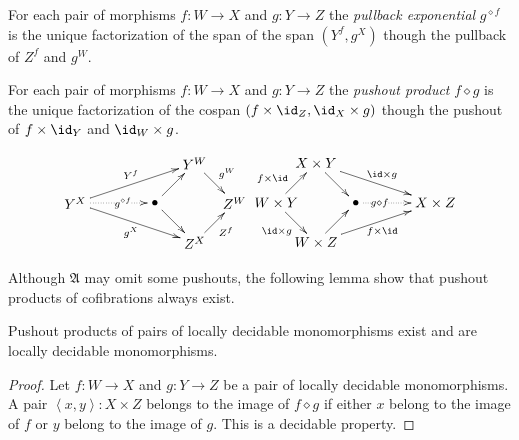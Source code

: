 \documentclass{tac}
\newcommand\hide[1]{}
\newcommand\of{:}
\newcommand\tuplet[1]{\left\langle #1 \right\rangle}
\newcommand\pe[1]{^{\diamond #1}}
\newcommand\pp{\mathbin\diamond}
\newcommand\ambient{\mathfrak A}
\begin{document}
\begin{definition} For each pair of morphisms $f\of W\to X$ and $g\of Y\to Z$ the \emph{pullback exponential} $g\pe f$ is the unique factorization of the span of the span $(Y^f, g^X)$ though the pullback of $Z^f$ and $g^W$. 
\hide{\[\xymatrix{
Y^X \ar@/^2ex/[rr]^{Y^f} \ar[dr]_{g^X} \ar@{.>}[r]_(.6){g\pe f}
& \bullet \ar[r]\ar[d] & Y^W \ar[d]^{g^W} \\
& Z^X \ar[r]_{Z^f} & Z^W
}\]}

For each pair of morphisms $f\of W\to X$ and $g\of Y\to Z$ the \emph{pushout product} $f\pp g$ is the unique factorization of the cospan $(f\times \id_Z , \id_X\times g)$ though the pushout of $f\times \id_Y$ and $\id_W\times g$. 
\hide{\[\xymatrix{
W\times Y \ar[r]^{f\times \id} \ar[d]_{\id\times g} \po & X\times Y \ar[d] \ar[dr]^{\id\times g} \\
W\times Z \ar[r] \ar@/_2ex/[rr]_{f\times\id} & \bullet \ar[r]^(.4){f\pp g} & X\times Z
}\]}
\[\xy
(0,10)*+{Y^X}="left",(20,10)*+{\bullet}="middle",(30,20)*+{Y^W}="top",(30,0)*+{Z^X}="bottom",(40,10)*+{Z^W}="right"
\ar^{Y^f} "left";"top" \ar_{g^X} "left";"bottom" \ar@{.>}|(.6){g\pe f} "left";"middle" 
\ar "middle";"top" \ar "middle";"bottom" \ar^{g^W} "top";"right" \ar_{Z^f} "bottom";"right"
\endxy\xy
(0,10)*+{W\times Y}="left",(20,10)*+{\bullet}="middle",(10,20)*+{X\times Y}="top",(10,0)*+{W\times Z}="bottom",(40,10)*+{X\times Z}="right"
\ar^(.4){f\times \id} "left";"top" \ar_{\id\times g} "left";"bottom" \ar "top";"middle" \ar "bottom";"middle"
\ar@{.>}|(.3){g\pp f} "middle";"right" \ar^{\id\times g} "top";"right" \ar_{f\times\id} "bottom";"right"
\endxy\]

\end{definition}

Although $\ambient$ may omit some pushouts, the following lemma show that pushout products of cofibrations always exist.

\begin{lemma} Pushout products of pairs of locally decidable monomorphisms exist and are locally decidable monomorphisms. \end{lemma}

\begin{proof} Let $f\of W\to X$ and $g\of Y\to Z$ be a pair of locally decidable monomorphisms. A pair $\tuplet{x,y}\of X\times Z$ belongs to the image of $f\pp g$ if either $x$ belong to the image of $f$ or $y$ belong to the image of $g$. This is a decidable property.
\end{proof}
\end{document}
